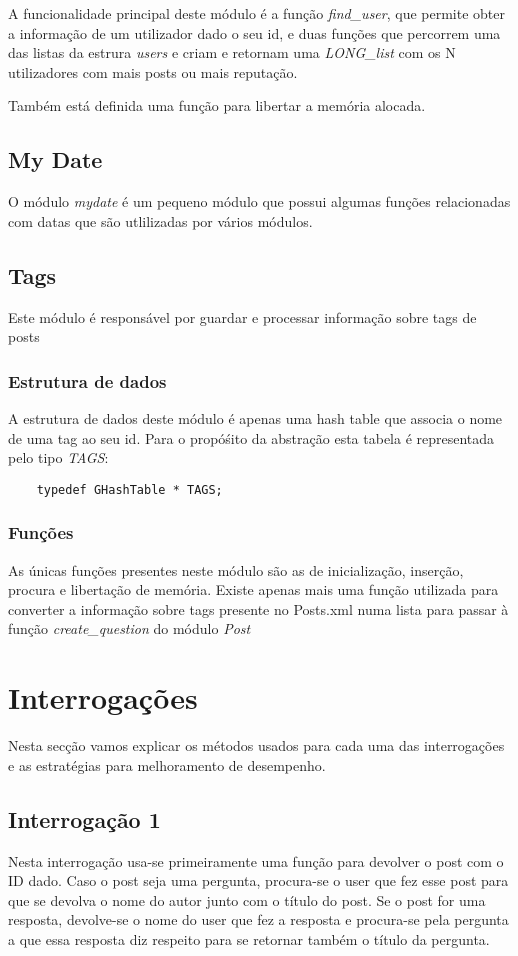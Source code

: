 \documentclass[10pt]{article}
\begin{document}
	A funcionalidade principal deste módulo é a função \emph{find\_user}, que permite obter a informação de um utilizador dado o seu id, e duas funções que percorrem uma das listas da estrura \emph{users} e criam e retornam uma \emph{LONG\_list} com os N utilizadores com mais posts ou mais reputação.

	Também está definida uma função para libertar a memória alocada.

\subsection{My Date}

	O módulo \emph{mydate} é um pequeno módulo que possui algumas funções relacionadas com datas que são utlilizadas por vários módulos. 

\subsection{Tags}
	Este módulo é responsável por guardar e processar informação sobre tags de posts
\subsubsection{Estrutura de dados}
	A estrutura de dados deste módulo é apenas uma hash table que associa o nome de uma tag ao seu id. Para o propóśito da abstração esta tabela é representada pelo tipo \emph{TAGS}:
	\begin{lstlisting} 
	typedef GHashTable * TAGS;
	\end{lstlisting}

\subsubsection{Funções}
	As únicas funções presentes neste módulo são as de inicialização, inserção, procura e libertação de memória. Existe apenas mais uma função utilizada para converter a informação sobre tags presente no Posts.xml numa lista para passar à função \emph{create\_question} do módulo \emph{Post}

\section{Interrogações}

	Nesta secção vamos explicar os métodos usados para cada uma das interrogações e as estratégias para melhoramento de desempenho.

\subsection{Interrogação 1}
	Nesta interrogação usa-se primeiramente uma função para devolver o post com o ID dado. Caso o post seja uma pergunta, procura-se o user que fez esse post para que se devolva o nome do autor junto com o título do post. Se o post for uma resposta, devolve-se o nome do user que fez a resposta e procura-se pela pergunta a que essa resposta diz respeito para se retornar também o título da pergunta. 
\end{document}
